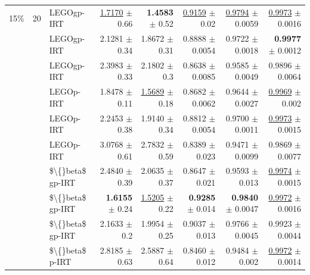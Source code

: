 \begin{longtable}{llp{}rrrrr}
\midrule
15\% & 20 & LEGOgp-IRT & \underline{1.7170} {\scriptsize $\pm$ 0.66} & \textbf{1.4583} {\scriptsize $\pm$ 0.52} & \underline{0.9159} {\scriptsize $\pm$ 0.02} & \underline{0.9794} {\scriptsize $\pm$ 0.0059} & \underline{0.9973} {\scriptsize $\pm$ 0.0016} \\
 &  & LEGOgp-IRT & 2.1281 {\scriptsize $\pm$ 0.34} & 1.8672 {\scriptsize $\pm$ 0.31} & 0.8888 {\scriptsize $\pm$ 0.0054} & 0.9722 {\scriptsize $\pm$ 0.0018} & \textbf{0.9977} {\scriptsize $\pm$ 0.0012} \\
 &  & LEGOgp-IRT & 2.3983 {\scriptsize $\pm$ 0.33} & 2.1802 {\scriptsize $\pm$ 0.3} & 0.8638 {\scriptsize $\pm$ 0.0085} & 0.9585 {\scriptsize $\pm$ 0.0049} & 0.9896 {\scriptsize $\pm$ 0.0064} \\
 &  & LEGOp-IRT & 1.8478 {\scriptsize $\pm$ 0.11} & \underline{1.5689} {\scriptsize $\pm$ 0.18} & 0.8682 {\scriptsize $\pm$ 0.0062} & 0.9644 {\scriptsize $\pm$ 0.0027} & \underline{0.9969} {\scriptsize $\pm$ 0.002} \\
 &  & LEGOp-IRT & 2.2453 {\scriptsize $\pm$ 0.38} & 1.9140 {\scriptsize $\pm$ 0.34} & 0.8812 {\scriptsize $\pm$ 0.0054} & 0.9700 {\scriptsize $\pm$ 0.0011} & \underline{0.9973} {\scriptsize $\pm$ 0.0015} \\
 &  & LEGOp-IRT & 3.0768 {\scriptsize $\pm$ 0.61} & 2.7832 {\scriptsize $\pm$ 0.59} & 0.8389 {\scriptsize $\pm$ 0.023} & 0.9471 {\scriptsize $\pm$ 0.0099} & 0.9869 {\scriptsize $\pm$ 0.0077} \\
 &  & \$\textbackslash\{\}beta\$ gp-IRT & 2.4840 {\scriptsize $\pm$ 0.39} & 2.0635 {\scriptsize $\pm$ 0.37} & 0.8647 {\scriptsize $\pm$ 0.021} & 0.9593 {\scriptsize $\pm$ 0.013} & \underline{0.9974} {\scriptsize $\pm$ 0.0015} \\
 &  & \$\textbackslash\{\}beta\$ gp-IRT & \textbf{1.6155} {\scriptsize $\pm$ 0.24} & \underline{1.5205} {\scriptsize $\pm$ 0.22} & \textbf{0.9285} {\scriptsize $\pm$ 0.014} & \textbf{0.9840} {\scriptsize $\pm$ 0.0047} & \underline{0.9972} {\scriptsize $\pm$ 0.0016} \\
 &  & \$\textbackslash\{\}beta\$ gp-IRT & 2.1633 {\scriptsize $\pm$ 0.2} & 1.9954 {\scriptsize $\pm$ 0.25} & 0.9037 {\scriptsize $\pm$ 0.013} & 0.9766 {\scriptsize $\pm$ 0.0045} & 0.9923 {\scriptsize $\pm$ 0.0044} \\
 &  & \$\textbackslash\{\}beta\$ p-IRT & 2.8185 {\scriptsize $\pm$ 0.63} & 2.5887 {\scriptsize $\pm$ 0.64} & 0.8460 {\scriptsize $\pm$ 0.012} & 0.9484 {\scriptsize $\pm$ 0.002} & \underline{0.9972} {\scriptsize $\pm$ 0.0014} \\

\end{longtable}
